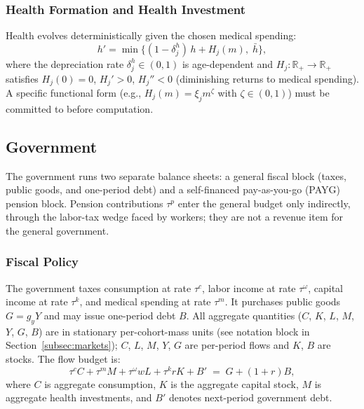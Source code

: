 \documentclass[12pt,a4paper]{article}
\begin{document}
\subsubsection{Health Formation and Health Investment}
\label{subsubsec:health}

Health evolves deterministically given the chosen medical spending:
\begin{equation}
\label{eq:health_formation}
h' = \min\bigl\{(1 - \delta_j^h)\, h + H_j(m),\; \bar h\bigr\},
\end{equation}
where the depreciation rate $\delta_j^h \in (0, 1)$ is age-dependent and $H_j: \mathbb{R}_+ \to \mathbb{R}_+$ satisfies $H_j(0) = 0$, $H_j' > 0$, $H_j'' < 0$ (diminishing returns to medical spending). A specific functional form (e.g., $H_j(m) = \xi_j m^{\zeta}$ with $\zeta \in (0,1)$) must be committed to before computation.


\subsection{Government}
\label{subsec:government}

The government runs two separate balance sheets: a general fiscal block (taxes, public goods, and one-period debt) and a self-financed pay-as-you-go (PAYG) pension block. Pension contributions $\tau^p$ enter the general budget only indirectly, through the labor-tax wedge faced by workers; they are not a revenue item for the general government.

\subsubsection{Fiscal Policy}
\label{subsubsec:fiscal}
The government taxes consumption at rate $\tau^c$, labor income at rate $\tau^\omega$, capital income at rate $\tau^k$, and medical spending at rate $\tau^m$. It purchases public goods $G = g_y Y$ and may issue one-period debt $B$. All aggregate quantities ($C$, $K$, $L$, $M$, $Y$, $G$, $B$) are in stationary per-cohort-mass units (see notation block in Section~\ref{subsec:markets}); $C$, $L$, $M$, $Y$, $G$ are per-period flows and $K$, $B$ are stocks. The flow budget is:
\begin{equation}
\label{eq:gov_budget}
\tau^c C + \tau^m M + \tau^\omega w L + \tau^k r K + B' \;=\; G + (1+r)B,
\end{equation}
where $C$ is aggregate consumption, $K$ is the aggregate capital stock, $M$ is aggregate health investments, and $B'$ denotes next-period government debt.
\end{document}
